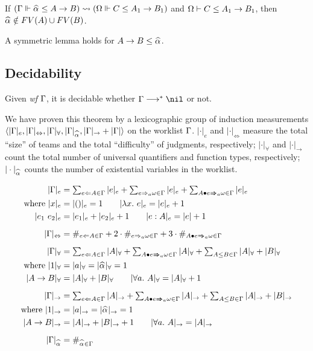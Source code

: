 \begin{lemma}
If $(\Gm \Vdash \al \le A \to B) \sto (\Om \Vdash C \le A_1 \to B_1)$ and
$\Omega \vdash C \le A_1 \to B_1$, then $\al\notin FV(A) \cup FV(B)$.
\end{lemma}

A symmetric lemma holds for $A\to B \le \al$.

\subsection{Decidability}
\begin{theorem}[Decidability]
Given \emph{wf }$\Gamma$, it is decidable whether $\Gm\redto\nil$ or not.
\end{theorem}

We have proven this theorem by a lexicographic group of induction measurements\\
$\langle |\Gm|_e, |\Gm|_\Leftrightarrow, |\Gm|_\forall, |\Gm|_{\al}, |\Gm|_\to + |\Gm| \rangle$
on the worklist $\Gamma$.
$|\cdot|_e$ and $|\cdot|_\Leftrightarrow$ measure the total ``size'' of teams
and the total ``difficulty'' of judgments, respectively;
$|\cdot|_\forall$ and $|\cdot|_\to$ count the total number of
universal quantifiers and function types, respectively;
$|\cdot|_{\al}$ counts the number of existential variables in the worklist.

\begin{definition}
\begin{gather*}
\begin{aligned}
|\Gm|_e &= \textstyle\sum_{e\Lto A\in\Gm}|e|_e + \sum_{e\To_a \jg\in\Gm}|e|_e +
    \sum_{\appInfAlg{A}{e}\in\Gm}|e|_e\\
\text{where } |x|_e &= |()|_e = 1 \qquad |\lam e|_e = |e|_e + 1\\
|e_1~e_2|_e &= |e_1|_e + |e_2|_e + 1 \qquad |e:A|_e = |e| + 1\\[2mm]
%
|\Gm|_\Leftrightarrow &= \#_{e\Lto A\in\Gm} +
    2\cdot\#_{e\To_a \jg\in\Gm} + 3\cdot\#_{\appInfAlg{A}{e}\in\Gm}\\[2mm]
|\Gm|_\forall &= \textstyle\sum_{e\Lto A\in\Gm}|A|_\forall + \sum_{\appInfAlg{A}{e}\in\Gm}|A|_\forall +
    \sum_{A\le B\in\Gm} |A|_\forall + |B|_\forall\\
\text{where } |1|_\forall &= |a|_\forall = |\al|_\forall = 1\\
|A\to B|_\forall &= |A|_\forall + |B|_\forall \qquad |\all A|_\forall = |A|_\forall + 1\\[2mm]
%
|\Gm|_\to &= \textstyle\sum_{e\Lto A\in\Gm}|A|_\to + \sum_{\appInfAlg{A}{e}\in\Gm}|A|_\to +
    \sum_{A\le B\in\Gm} |A|_\to + |B|_\to\\
\text{where } |1|_\to &= |a|_\to = |\al|_\to = 1\\
|A\to B|_\to &= |A|_\to + |B|_\to + 1 \qquad |\all A|_\to = |A|_\to\\[2mm]
%
|\Gm|_{\al} &= \#_{\al\in\Gm}\\
\end{aligned}
\end{gather*}
\end{definition}

